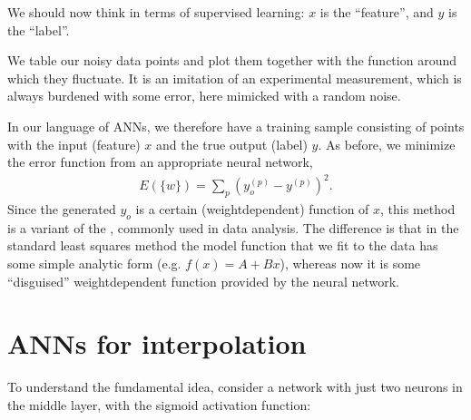 \documentclass[letterpaper,10pt,english]{jupyterBook}
\begin{document}
\sphinxAtStartPar
We should now think in terms of supervised learning: \(x\) is the “feature”, and \(y\) is the “label”.

\sphinxAtStartPar
We table our noisy data points and plot them together with the function  around which they fluctuate. It is an imitation of an experimental measurement, which is always burdened with some error, here mimicked with a random noise.

\begin{sphinxVerbatim}[commandchars=\\\{\}]
\PYG{p}{[}    \PYG{p}{]}    
                   
                     
\end{sphinxVerbatim}

\noindent{}

\sphinxAtStartPar
In our language of ANNs, we therefore have a training sample consisting of points with the input (feature) \(x\) and the true output (label) \(y\). As before, we minimize the error function from an appropriate neural network,
\begin{equation*}
\begin{split}E(\{w \}) = \sum_p (y_o^{(p)} - y^{(p)})^2. \end{split}
\end{equation*}
\sphinxAtStartPar
Since the generated \(y_o\) is a certain (weight\sphinxhyphen{}dependent) function of \(x\), this method is a variant of the , commonly used in data analysis. The difference is that in the standard least squares method the model function that we fit to the data has some simple analytic form (e.g. \( f(x) = A + B x\)), whereas now it is some “disguised” weight\sphinxhyphen{}dependent function provided by the neural network.


\section{ANNs for interpolation}
\label{\detokenize{docs/interpol:anns-for-interpolation}}
\sphinxAtStartPar
To understand the fundamental idea, consider a network with just two neurons in the middle layer, with the sigmoid activation function:
\end{document}
